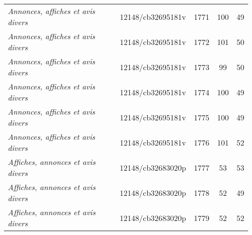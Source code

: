 \begin{table}[ht]
{\begin{tabular}{lcccc}
			\textit{Annonces, affiches et avis divers}                               & 12148/cb32695181v                             & 1771                                & 100                                               & 49                                              \\ 
			\textit{Annonces, affiches et avis divers}                               & 12148/cb32695181v                             & 1772                                & 101                                               & 50                                              \\ 
			\textit{Annonces, affiches et avis divers}                               & 12148/cb32695181v                             & 1773                                & 99                                                & 50                                              \\ 
			\textit{Annonces, affiches et avis divers}                               & 12148/cb32695181v                             & 1774                                & 100                                               & 49                                              \\ 
			\textit{Annonces, affiches et avis divers}                               & 12148/cb32695181v                             & 1775                                & 100                                               & 49                                              \\ 
			\textit{Annonces, affiches et avis divers}                               & 12148/cb32695181v                             & 1776                                & 101                                               & 52                                              \\ 
			\textit{Affiches, annonces et avis divers}                               & 12148/cb32683020p                             & 1777                                & 53                                                & 53                                              \\ 
			\textit{Affiches, annonces et avis divers}                               & 12148/cb32683020p                             & 1778                                & 52                                                & 49                                              \\ 
			\textit{Affiches, annonces et avis divers}                               & 12148/cb32683020p                             & 1779                                & 52                                                & 52                                              \\ 

\end{tabular}}
\end{table}
